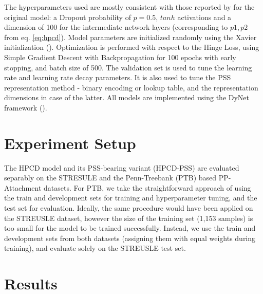 The hyperparameters used are mostly consistent with those reported by \cite{hpcd} for the original model: a Dropout probability of $p = 0.5$, $tanh$ activations and a dimension of 100 for the intermediate network layers (corresponding to $p1, p2$ from eq. \ref{eq:hpcd}). Model parameters are initialized randomly using the Xavier initialization (\cite{glorot10xavier}). Optimization is performed with respect to the Hinge Loss, using Simple Gradient Descent with Backpropagation for 100 epochs with early stopping, and batch size of 500. The validation set is used to tune the learning rate and learning rate decay parameters. It is also used to tune the PSS representation method - binary encoding or lookup table, and the representation dimensions in case of the latter. All models are implemented using the DyNet framework (\cite{dynet}). 

\section{Experiment Setup} \label{sec:ppatt_setup}

The HPCD model and its PSS-bearing variant (HPCD-PSS) are evaluated separably on the STRESULE and the Penn-Treebank (PTB) based PP-Attachment datasets. For PTB, we take the straightforward approach of using the train and development sets for training and hyperparameter tuning, and the test set for evaluation. Ideally, the same procedure would have been applied on the STREUSLE dataset, however the size of the training set (1,153 samples) is too small for the model to be trained successfully. Instead, we use the train and development sets from both datasets (assigning them with equal weights during training), and evaluate solely on the STREUSLE test set. 

\section{Results} \label{sec:ppatt_results}

